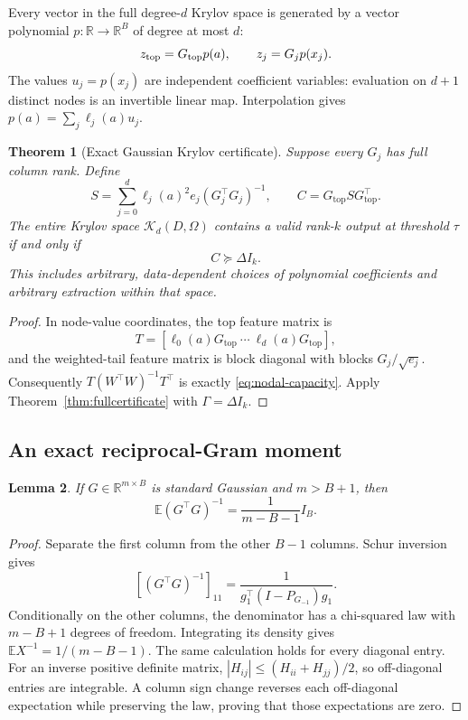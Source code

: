 \documentclass[11pt]{article}
\newtheorem{theorem}{Theorem}[section]
\newtheorem{lemma}[theorem]{Lemma}
\theoremstyle{definition}
\newcommand{\R}{\mathbb R}
\newcommand{\E}{\mathbb E}
\newcommand{\K}{\mathcal K}
\begin{document}
Every vector in the full degree-$d$ Krylov space is generated by a vector polynomial $p:\R\to\R^B$ of degree at most $d$:
\[
 z_{\rm top}=G_{\mathrm{top}}p(a),\qquad z_j=G_jp(x_j).
\]
The values $u_j=p(x_j)$ are independent coefficient variables: evaluation on $d+1$ distinct nodes is an invertible linear map. Interpolation gives $p(a)=\sum_j\ell_j(a)u_j$.

\begin{theorem}[Exact Gaussian Krylov certificate]\label{thm:gaussiancertificate}
Suppose every $G_j$ has full column rank. Define
\begin{equation}\label{eq:nodal-capacity}
 S=\sum_{j=0}^d\ell_j(a)^2e_j(G_j^\top G_j)^{-1},\qquad
 C=G_{\mathrm{top}}S G_{\mathrm{top}}^\top.
\end{equation}
The entire Krylov space $\K_d(D,\Omega)$ contains a valid rank-$k$ output at threshold $\tau$ if and only if
\begin{equation}\label{eq:nodalcriterion}
 C\succeq\Delta I_k.
\end{equation}
This includes arbitrary, data-dependent choices of polynomial coefficients and arbitrary extraction within that space.
\end{theorem}
\begin{proof}
In node-value coordinates, the top feature matrix is
\[
 T=[\ell_0(a)G_{\mathrm{top}}\ \cdots\ \ell_d(a)G_{\mathrm{top}}],
\]
and the weighted-tail feature matrix is block diagonal with blocks $G_j/\sqrt{e_j}$. Consequently $T(W^\top W)^{-1}T^\top$ is exactly \eqref{eq:nodal-capacity}. Apply Theorem~\ref{thm:fullcertificate} with $\Gamma=\Delta I_k$.
\end{proof}

\subsection{An exact reciprocal-Gram moment}
\begin{lemma}\label{lem:moment}
If $G\in\R^{m\times B}$ is standard Gaussian and $m>B+1$, then
\begin{equation}\label{eq:moment}
 \E(G^\top G)^{-1}=\frac{1}{m-B-1}I_B.
\end{equation}
\end{lemma}
\begin{proof}
Separate the first column from the other $B-1$ columns. Schur inversion gives
\[
 [(G^\top G)^{-1}]_{11}
 =\frac{1}{g_1^\top(I-P_{G_{-1}})g_1}.
\]
Conditionally on the other columns, the denominator has a chi-squared law with $m-B+1$ degrees of freedom. Integrating its density gives $\E X^{-1}=1/(m-B-1)$. The same calculation holds for every diagonal entry. For an inverse positive definite matrix, $|H_{ij}|\le(H_{ii}+H_{jj})/2$, so off-diagonal entries are integrable. A column sign change reverses each off-diagonal expectation while preserving the law, proving that those expectations are zero.
\end{proof}
\end{document}
